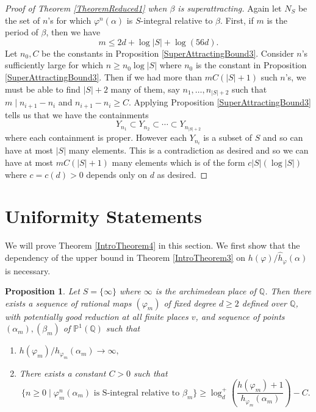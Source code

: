 \documentclass[10pt, reqno]{amsart}
\newcommand{\bb}{\mathbb}
\newcommand{\vphi}{\varphi}
\newcommand{\h}{\widehat{h}}
\numberwithin{theorem}{section}
\newtheorem{proposition}[theorem]{Proposition}
\numberwithin{equation}{section}
\numberwithin{example}{section}
\numberwithin{definition}{section}
\begin{document}
\begin{proof}[Proof of Theorem \ref{TheoremReduced1} when $\beta$ is superattracting] Again let $N_S$ be the set of $n$'s for which $\vphi^n(\alpha)$ is $S$-integral relative to $\beta$. First, if $m$ is the period of $\beta$, then we have 
$$m \leq 2d + \log |S| + \log (56d).$$
Let $n_0,C$ be the constants in Proposition \ref{SuperAttractingBound3}. Consider $n$'s sufficiently large for which $n \geq n_0 \log |S|$ where $n_0$ is the constant in Proposition \ref{SuperAttractingBound3}. Then if we had more than $m C(|S|+1)$ such $n$'s, we must be able to find $|S|+2$ many of them, say $n_1,\ldots,n_{|S|+2}$ such that $m \mid n_{i+1} - n_i$ and $n_{i+1} - n_i \geq C$. Applying Proposition \ref{SuperAttractingBound3} tells us that we have the containments
$$Y_{n_1} \subset Y_{n_2} \subset \cdots \subset Y_{n_{|S|+2}}$$
where each containment is proper. However each $Y_{n_i}$ is a subset of $S$ and so can have at most $|S|$ many elements. This is a contradiction as desired and so we can have at most $mC(|S|+1)$ many elements which is of the form $c |S|(\log |S|)$ where $c = c(d) > 0$ depends only on $d$ as desired.
\end{proof}

\section{Uniformity Statements} \label{sec: Uniform}
We will prove Theorem \ref{IntroTheorem4} in this section. We first show that the dependency of the upper bound in Theorem \ref{IntroTheorem3} on $h(\vphi)/\h_{\vphi}(\alpha)$ is necessary.

\begin{proposition}
Let $S = \{\infty\}$ where $\infty$ is the archimedean place of $\bb{Q}$. Then there exists a sequence of rational maps $(\vphi_m)$ of fixed degree $d \geq 2$ defined over $\bb{Q}$, with potentially good reduction at all finite places $v$, and sequence of points $(\alpha_m), (\beta_m)$ of $\bb{P}^1(\bb{Q})$ such that

\begin{enumerate}
\item $h(\vphi_m)/h_{\vphi_m}(\alpha_m) \to \infty,$
\item There  exists a constant $C > 0$ such that
$$\{n \geq 0 \mid \vphi_m^n(\alpha_m) \text{ is S-integral relative to } \beta_m\} \geq \log^+_d \left( \frac{h(\vphi_m) + 1}{h_{\vphi_m}(\alpha_m)} \right) - C.$$
\end{enumerate}
\end{proposition}
\end{document}
